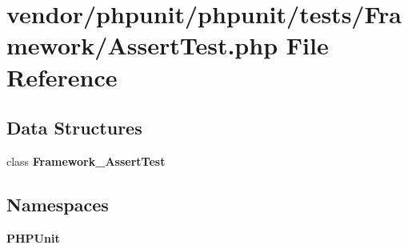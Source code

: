 \section{vendor/phpunit/phpunit/tests/\+Framework/\+Assert\+Test.php File Reference}
\label{_assert_test_8php}
\subsection*{Data Structures}
\begin{DoxyCompactItemize}
\item 
class {\bf Framework\+\_\+\+Assert\+Test}
\end{DoxyCompactItemize}
\subsection*{Namespaces}
\begin{DoxyCompactItemize}
\item 
 {\bf P\+H\+P\+Unit}
\end{DoxyCompactItemize}
